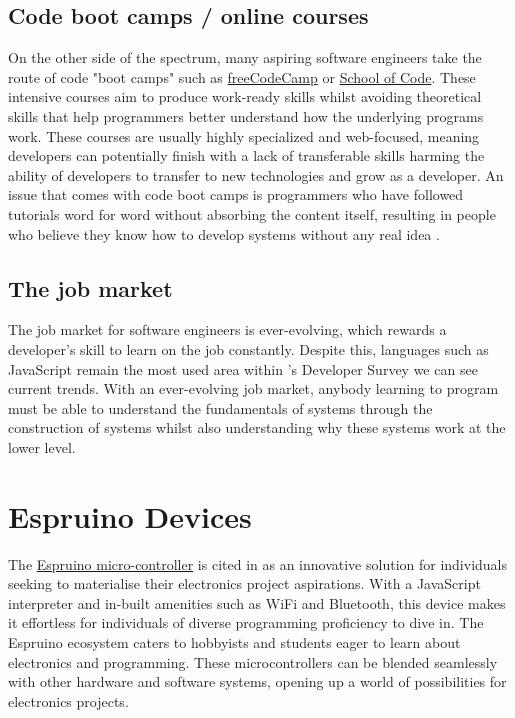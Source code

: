 \documentclass{l4proj}
\begin{document}
\subsection{Code boot camps / online courses}
On the other side of the spectrum, many aspiring software engineers take the route of code "boot camps" such as \href{https://www.freecodecamp.org/}{freeCodeCamp} or \href{https://www.schoolofcode.co.uk/}{School of Code}. These intensive courses aim to produce work-ready skills whilst avoiding theoretical skills that help programmers better understand how the underlying programs work. These courses are usually highly specialized and web-focused, meaning developers can potentially finish with a lack of transferable skills harming the ability of developers to transfer to new technologies and grow as a developer. An issue that comes with code boot camps is programmers who have followed tutorials word for word without absorbing the content itself, resulting in people who believe they know how to develop systems without any real idea \citep{thayer2017barriers}.

\subsection{The job market}
The job market for software engineers is ever-evolving, which rewards a developer's skill to learn on the job constantly. Despite this, languages such as JavaScript remain the most used area within \cite{stack-overflow-dev-survey}'s Developer Survey we can see current trends. With an ever-evolving job market, anybody learning to program must be able to understand the fundamentals of systems through the construction of systems whilst also understanding why these systems work at the lower level.

\section{Espruino Devices}
\text 
The \href{https://www.espruino.com/}{Espruino micro-controller} is cited in \cite{parihar2019internet} as an innovative solution for individuals seeking to materialise their electronics project aspirations. With a JavaScript interpreter and in-built amenities such as WiFi and Bluetooth, this device makes it effortless for individuals of diverse programming proficiency to dive in. The Espruino ecosystem caters to hobbyists and students eager to learn about electronics and programming. These microcontrollers can be blended seamlessly with other hardware and software systems, opening up a world of possibilities for electronics projects.
\end{document}
